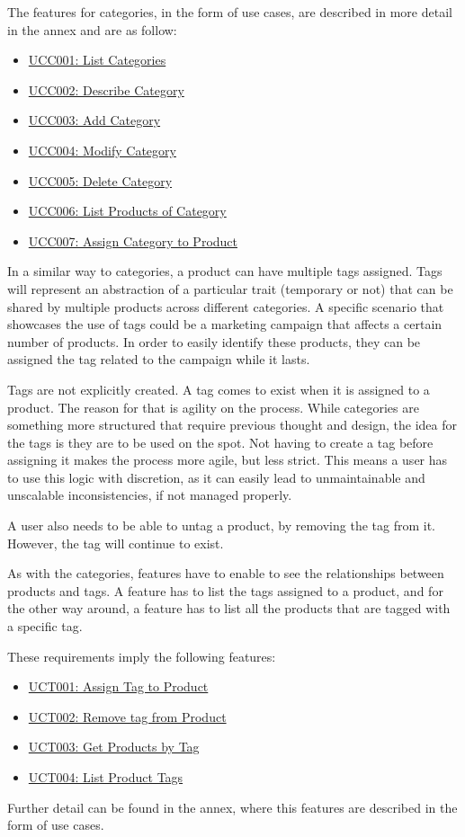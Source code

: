 The features for categories, in the form of use cases, are described in more detail in the annex and are as follow:
\hfill\break
\begin{itemize}
\item \hyperref[UCC001]{UCC001: List Categories}
\item \hyperref[UCC002]{UCC002: Describe Category}
\item \hyperref[UCC003]{UCC003: Add Category}
\item \hyperref[UCC004]{UCC004: Modify Category}
\item \hyperref[UCC005]{UCC005: Delete Category}
\item \hyperref[UCC006]{UCC006: List Products of Category}
\item \hyperref[UCC007]{UCC007: Assign Category to Product}
\end{itemize}
\hfill\break
In a similar way to categories, a product can have multiple tags assigned. Tags will represent an abstraction of a particular trait (temporary or not) that can be shared by multiple products across different categories. A specific scenario that showcases the use of tags could be a marketing campaign that affects a certain number of products. In order to easily identify these products, they can be assigned the tag related to the campaign while it lasts.

Tags are not explicitly created. A tag comes to exist when it is assigned to a product. The reason for that is agility on the process. While categories are something more structured that require previous thought and design, the idea for the tags is they are to be used on the spot. Not having to create a tag before assigning it makes the process more agile, but less strict. This means a user has to use this logic with discretion, as it can easily lead to unmaintainable and unscalable inconsistencies, if not managed properly.

A user also needs to be able to untag a product, by removing the tag from it. However, the tag will continue to exist.

As with the categories, features have to enable to see the relationships between products and tags. A feature has to list the tags assigned to a product, and for the other way around, a feature has to list all the products that are tagged with a specific tag.

These requirements imply the following features:
\hfill\break
\begin{itemize}
\item \hyperref[UCT001]{UCT001: Assign Tag to Product}
\item \hyperref[UCT002]{UCT002: Remove tag from Product}
\item \hyperref[UCT003]{UCT003: Get Products by Tag}
\item \hyperref[UCT004]{UCT004: List Product Tags}
\end{itemize}
\hfill\break
Further detail can be found in the annex, where this features are described in the form of use cases.

